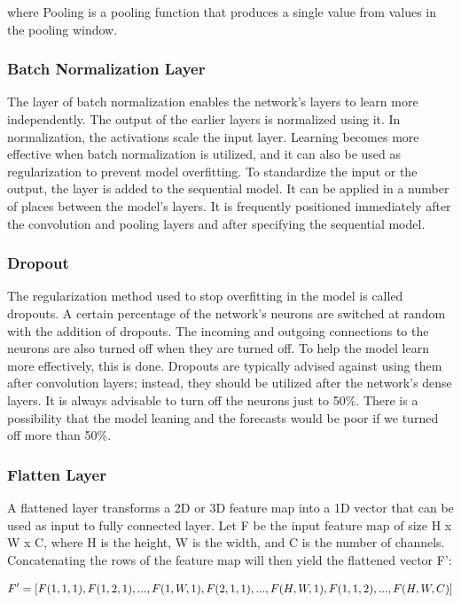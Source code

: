 
where Pooling is a pooling function that produces a single value from values in the pooling window.

\subsubsection{Batch Normalization Layer}
The layer of batch normalization enables the network's layers to learn more independently. The output of the earlier layers is normalized using it. In normalization, the activations scale the input layer. Learning becomes more effective when batch normalization is utilized, and it can also be used as regularization to prevent model overfitting. To standardize the input or the output, the layer is added to the sequential model. It can be applied in a number of places between the model's layers. It is frequently positioned immediately after the convolution and pooling layers and after specifying the sequential model.

\subsubsection{Dropout}
The regularization method used to stop overfitting in the model is called dropouts. A certain percentage of the network's neurons are switched at random with the addition of dropouts. The incoming and outgoing connections to the neurons are also turned off when they are turned off. To help the model learn more effectively, this is done. Dropouts are typically advised against using them after convolution layers; instead, they should be utilized after the network's dense layers. It is always advisable to turn off the neurons just to 50\%. There is a possibility that the model leaning and the forecasts would be poor if we turned off more than 50\%.

\subsubsection{Flatten Layer}
A flattened layer transforms a 2D or 3D feature map into a 1D vector that can be used as input to fully connected layer. 
Let F be the input feature map of size H x W x C, where H is the height, W is the width, and C is the number of channels. Concatenating the rows of the feature map will then yield the flattened vector F':

\begin{equation}
\label{eq:flatten_layer}
    \textcolor{black}{F' = [F(1,1,1), F(1,2,1), ..., F(1,W,1), F(2,1,1), ..., F(H,W,1), F(1,1,2), ..., F(H,W,C)]}
\end{equation}

